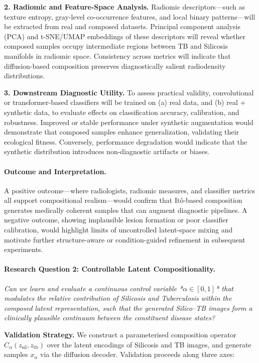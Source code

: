 \textbf{2. Radiomic and Feature-Space Analysis.}  
Radiomic descriptors—such as texture entropy, gray-level co-occurrence features, and local binary patterns—will be extracted from real and composed datasets.  
Principal component analysis (PCA) and t-SNE/UMAP embeddings of these descriptors will reveal whether composed samples occupy intermediate regions between TB and Silicosis manifolds in radiomic space.  
Consistency across metrics will indicate that diffusion-based composition preserves diagnostically salient radiodensity distributions.

\textbf{3. Downstream Diagnostic Utility.}  
To assess practical validity, convolutional or transformer-based classifiers will be trained on (a) real data, and (b) real + synthetic data, to evaluate effects on classification accuracy, calibration, and robustness.  
Improved or stable performance under synthetic augmentation would demonstrate that composed samples enhance generalization, validating their ecological fitness.  
Conversely, performance degradation would indicate that the synthetic distribution introduces non-diagnostic artifacts or biases.

\paragraph{Outcome and Interpretation.}
A positive outcome—where radiologists, radiomic measures, and classifier metrics all support compositional realism—would confirm that Itô-based composition generates medically coherent samples that can augment diagnostic pipelines.  
A negative outcome, showing implausible lesion formation or poor classifier calibration, would highlight limits of uncontrolled latent-space mixing and motivate further structure-aware or condition-guided refinement in subsequent experiments.

\paragraph{Research Question 2: Controllable Latent Compositionality.}
\emph{Can we learn and evaluate a continuous control variable *\(\alpha \in [0,1]\)* that modulates the relative contribution of Silicosis and Tuberculosis within the composed latent representation, such that the generated Silico--TB images form a clinically plausible continuum between the constituent disease states?}

\textbf{Validation Strategy.}
We construct a parameterised composition operator \(C_{\alpha}(z_{\mathrm{sil}}, z_{\mathrm{tb}})\) over the latent encodings of Silicosis and TB images, and generate samples \(x_{\alpha}\) via the diffusion decoder. 
Validation proceeds along three axes:

